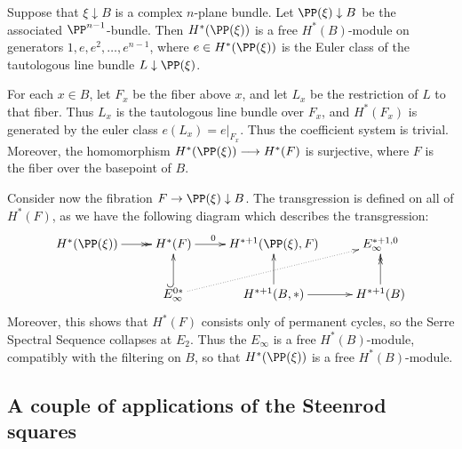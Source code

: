 \documentclass[11pt]{article}
\newcommand{\myheading}[1]
{{\noindent\Large #1}

}
\renewcommand{\myheading}[1]{\subsection{#1}}
\begin{document}
\begin{projective bundle theorem}
Suppose that $\xi\downarrow B$ is a complex $n$-plane bundle. Let $\PP(\xi)\downarrow B$ be the associated $\PP^{n-1}$-bundle. Then $H^*(\PP(\xi))$ is a free $H^*(B)$-module on generators $1,e,e^2,\ldots,e^{n-1}$, where $e\in H^*(\PP(\xi))$ is the Euler class of the tautologous line bundle $L\downarrow \PP(\xi)$.

For each $x\in B$, let $F_x$ be the fiber above $x$, and let $L_x$ be the restriction of $L$ to that fiber. Thus $L_x$ is the tautologous line bundle over $F_x$, and $H^*(F_x)$ is generated by the euler class $e(L_x)=e|_{F_x}$. Thus the coefficient system is trivial. Moreover, the homomorphism $H^*(\PP(\xi))\to H^*(F)$ is surjective, where $F$ is the fiber over the basepoint of $B$.

Consider now the fibration $F \rightarrow\PP(\xi)\downarrow B$. The transgression is defined on all of $H^*(F)$, as we have the following diagram which describes the transgression:
\[\xymatrix{
H^*(\PP(\xi))\ar@{->>}[r]&H^*(F)\ar[r]^{0\ \ \ \ \ }&H^{*+1}(\PP(\xi),F)&E_\infty^{*+1,0}\\
&E_\infty^{0*}\ar@{^{(}->}[u]\ar@{.>}[rur]&H^{*+1}(B,*)\ar[u]\ar[r]&H^{*+1}(B)\ar@{->>}[u]
}\]
Moreover, this shows that $H^*(F)$ consists only of permanent cycles, so the Serre Spectral Sequence collapses at $E_2$. Thus the $E_\infty$ is a free $H^*(B)$-module, compatibly with the filtering on $B$, so that $H^*(\PP(\xi))$ is a free $H^*(B)$-module.



\end{projective bundle theorem}
\myheading{A couple of applications of the Steenrod squares}
\end{document}
